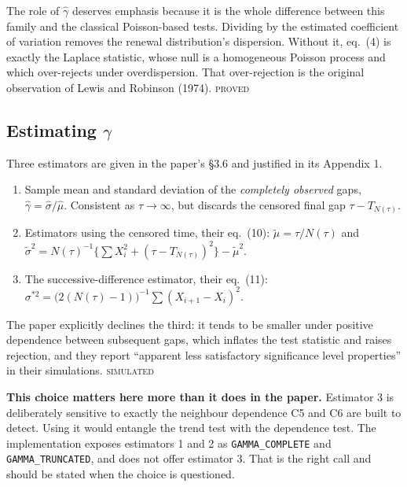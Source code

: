 \documentclass[11pt,a4paper]{article}
\newcommand{\gh}{\hat\gamma}
\newcommand{\Ntau}{N(\tau)}
\newcommand{\PROVED}{\textsc{\textcolor{blue!55!black}{proved}}}
\newcommand{\SIMULATED}{\textsc{\textcolor{orange!70!black}{simulated}}}
\begin{document}
\medskip
\noindent
The role of $\gh$ deserves emphasis because it is the whole difference between this
family and the classical Poisson-based tests. Dividing by the estimated coefficient of
variation removes the renewal distribution's dispersion. Without it, eq.~(4) is exactly
the Laplace statistic, whose null is a homogeneous Poisson process and which
over-rejects under overdispersion. That over-rejection is the original observation of
Lewis and Robinson (1974). \PROVED

\subsection{Estimating \texorpdfstring{$\gamma$}{gamma}}

Three estimators are given in the paper's \S 3.6 and justified in its Appendix 1.

\begin{enumerate}[leftmargin=1.6em,itemsep=2pt]
\item Sample mean and standard deviation of the \emph{completely observed} gaps,
$\gh = \hat\sigma / \hat\mu$. Consistent as $\tau\to\infty$, but discards the censored
final gap $\tau - T_{\Ntau}$.
\item Estimators using the censored time, their eq.~(10):
$\tilde\mu = \tau/\Ntau$ and
$\tilde\sigma^2 = \Ntau^{-1}\bigl\{\sum X_i^2 + (\tau - T_{\Ntau})^2\bigr\} - \tilde\mu^2$.
\item The successive-difference estimator, their eq.~(11):
$\sigma^{*2} = \bigl(2(\Ntau-1)\bigr)^{-1}\sum (X_{i+1}-X_i)^2$.
\end{enumerate}

The paper explicitly declines the third: it tends to be smaller under positive
dependence between subsequent gaps, which inflates the test statistic and raises
rejection, and they report \enquote{apparent less satisfactory significance level
properties} in their simulations. \SIMULATED

\medskip
\noindent\textbf{This choice matters here more than it does in the paper.} Estimator 3
is deliberately sensitive to exactly the neighbour dependence C5 and C6 are built to
detect. Using it would entangle the trend test with the dependence test. The
implementation exposes estimators 1 and 2 as \texttt{GAMMA\_COMPLETE} and
\texttt{GAMMA\_TRUNCATED}, and does not offer estimator 3. That is the right call and
should be stated when the choice is questioned.

\end{document}
